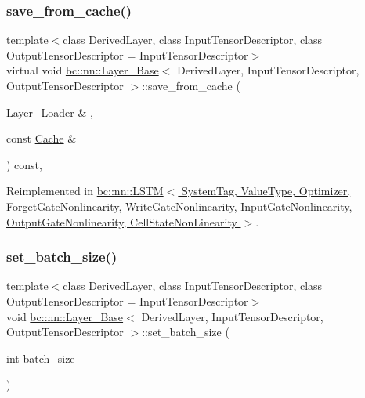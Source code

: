 \subsubsection{\texorpdfstring{save\+\_\+from\+\_\+cache()}{save\_from\_cache()}}
{\footnotesize\ttfamily template$<$class Derived\+Layer, class Input\+Tensor\+Descriptor, class Output\+Tensor\+Descriptor = Input\+Tensor\+Descriptor$>$ \\
virtual void \hyperlink{structbc_1_1nn_1_1Layer__Base}{bc\+::nn\+::\+Layer\+\_\+\+Base}$<$ Derived\+Layer, Input\+Tensor\+Descriptor, Output\+Tensor\+Descriptor $>$\+::save\+\_\+from\+\_\+cache (\begin{DoxyParamCaption}\item[{\hyperlink{structbc_1_1nn_1_1Layer__Loader}{Layer\+\_\+\+Loader} \&}]{,  }\item[{const \hyperlink{structbc_1_1nn_1_1Cache}{Cache} \&}]{ }\end{DoxyParamCaption}) const\hspace{0.3cm}{\ttfamily [inline]}, {\ttfamily [virtual]}}



Reimplemented in \hyperlink{structbc_1_1nn_1_1LSTM_a270951d7af7ffcf061d02bbb046a4dc7}{bc\+::nn\+::\+L\+S\+T\+M$<$ System\+Tag, Value\+Type, Optimizer, Forget\+Gate\+Nonlinearity, Write\+Gate\+Nonlinearity, Input\+Gate\+Nonlinearity, Output\+Gate\+Nonlinearity, Cell\+State\+Non\+Linearity $>$}.

\mbox{\label{structbc_1_1nn_1_1Layer__Base_a5a58881f4a7ffd91afea404227c2673c}} 
\subsubsection{\texorpdfstring{set\+\_\+batch\+\_\+size()}{set\_batch\_size()}}
{\footnotesize\ttfamily template$<$class Derived\+Layer, class Input\+Tensor\+Descriptor, class Output\+Tensor\+Descriptor = Input\+Tensor\+Descriptor$>$ \\
void \hyperlink{structbc_1_1nn_1_1Layer__Base}{bc\+::nn\+::\+Layer\+\_\+\+Base}$<$ Derived\+Layer, Input\+Tensor\+Descriptor, Output\+Tensor\+Descriptor $>$\+::set\+\_\+batch\+\_\+size (\begin{DoxyParamCaption}\item[{int}]{batch\+\_\+size }\end{DoxyParamCaption})\hspace{0.3cm}{\ttfamily [inline]}}

